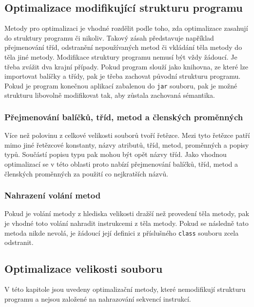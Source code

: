 \subsection{Optimalizace modifikující strukturu programu}

Metody pro optimalizaci je vhodné rozdělit podle toho, zda optimalizace zasahují do struktury programu či nikoliv. Takový zásah představuje například přejmenování tříd, odstranění nepoužívaných metod či vkládání těla metody do těla jiné metody.
Modifikace struktury programu nemusí být vždy žádoucí. Je třeba zvážit dva krajní případy. Pokud program slouží jako knihovna, ze které lze importovat balíčky a třídy, pak je třeba zachovat původní strukturu programu. Pokud je program konečnou aplikací zabalenou do \texttt{jar} souboru, pak je možné strukturu libovolně modifikovat tak, aby zůstala zachovaná sémantika.

\subsubsection{Přejmenování balíčků, tříd, metod a členských proměnných}
Více než polovinu z celkové velikosti souborů tvoří řetězce. Mezi tyto řetězce patří mimo jiné řetězcové konstanty, názvy atributů, tříd, metod, proměnných a popisy typů. Součástí popisu typu pak mohou být opět názvy tříd. Jako vhodnou optimalizací se v této oblasti proto nabízí přejmenování balíčků, tříd, metod a členských proměnných za použití co nejkratších názvů. 

\subsubsection{Nahrazení volání metod}
Pokud je volání metody z hlediska velikosti dražší než provedení těla metody, pak je vhodné toto volání nahradit instrukcemi z těla metody. Pokud se následně tato metoda nikde nevolá, je žádoucí její definici z příslušného \texttt{class} souboru zcela odstranit.


\subsection{Optimalizace velikosti souboru}

V této kapitole jsou uvedeny optimalizační metody, které nemodifikují strukturu programu a nejsou založené na nahrazování sekvencí instrukcí.

